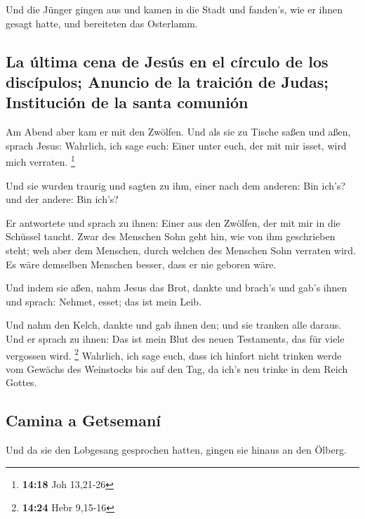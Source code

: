  Und die Jünger gingen aus und kamen in die Stadt und
fanden's, wie er ihnen gesagt hatte, und bereiteten das Osterlamm.

\hypertarget{la-uxfaltima-cena-de-jesuxfas-en-el-cuxedrculo-de-los-discuxedpulos-anuncio-de-la-traiciuxf3n-de-judas-instituciuxf3n-de-la-santa-comuniuxf3n}{%
\subsection{La última cena de Jesús en el círculo de los discípulos;
Anuncio de la traición de Judas; Institución de la santa
comunión}\label{la-uxfaltima-cena-de-jesuxfas-en-el-cuxedrculo-de-los-discuxedpulos-anuncio-de-la-traiciuxf3n-de-judas-instituciuxf3n-de-la-santa-comuniuxf3n}}

 Am Abend aber kam er mit den Zwölfen. 
Und als sie zu Tische saßen und aßen, sprach Jesus: Wahrlich, ich sage
euch: Einer unter euch, der mit mir isset, wird mich verraten.
\footnote{\textbf{14:18} Joh 13,21-26}

 Und sie wurden traurig und sagten zu ihm, einer nach dem
anderen: Bin ich's? und der andere: Bin ich's?

 Er antwortete und sprach zu ihnen: Einer aus den
Zwölfen, der mit mir in die Schüssel taucht.  Zwar des
Menschen Sohn geht hin, wie von ihm geschrieben steht; weh aber dem
Menschen, durch welchen des Menschen Sohn verraten wird. Es wäre
demselben Menschen besser, dass er nie geboren wäre.

 Und indem sie aßen, nahm Jesus das Brot, dankte und
brach's und gab's ihnen und sprach: Nehmet, esset; das ist mein Leib.

 Und nahm den Kelch, dankte und gab ihnen den; und sie
tranken alle daraus.  Und er sprach zu ihnen: Das ist
mein Blut des neuen Testaments, das für viele vergossen wird.
\footnote{\textbf{14:24} Hebr 9,15-16}  Wahrlich, ich
sage euch, dass ich hinfort nicht trinken werde vom Gewächs des
Weinstocks bis auf den Tag, da ich's neu trinke in dem Reich Gottes.

\hypertarget{camina-a-getsemanuxed}{%
\subsection{Camina a Getsemaní}\label{camina-a-getsemanuxed}}

 Und da sie den Lobgesang gesprochen hatten, gingen sie
hinaus an den Ölberg.

